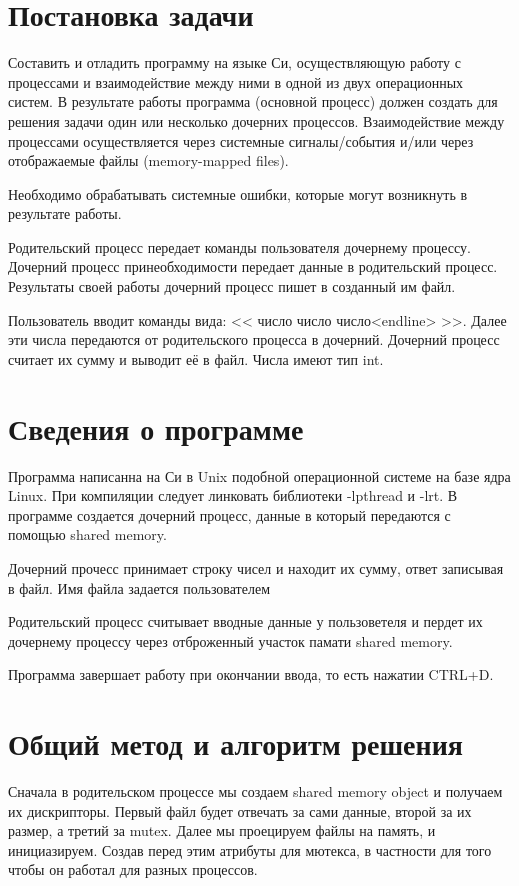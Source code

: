 \documentclass[pdf, unicode, 12pt, a4paper,oneside,fleqn]{article}
\begin{document}
\pagebreak

\section{Постановка задачи}

Составить и отладить программу на языке Си, осуществляющую работу с процессами 
и взаимодействие между ними в одной из двух операционных систем. В результате работы 
программа (основной процесс) должен создать для решения задачи один или несколько 
дочерних процессов. Взаимодействие между процессами осуществляется через системные 
сигналы/события и/или через отображаемые файлы (memory-mapped files).

Необходимо обрабатывать системные ошибки, которые могут возникнуть в результате работы.

Родительский процесс передает команды пользователя дочернему процессу. Дочерний процесс 
принеобходимости передает данные в родительский процесс. Результаты своей работы дочерний
процесс пишет в созданный им файл.

Пользователь вводит команды вида: << число число число<endline> >>. Далее эти числа 
передаются от родительского процесса в дочерний. Дочерний процесс считает их сумму и 
выводит её в файл. Числа имеют тип int.

\section{Сведения о программе}

Программа написанна на Си в Unix подобной операционной системе на базе ядра Linux.
При компиляции следует линковать библиотеки -lpthread и -lrt.
В программе создается дочерний процесс, данные в который передаются с помощью shared memory.

Дочерний прочесс принимает строку чисел и находит их сумму, ответ записывая в файл. Имя файла задается пользователем

Родительский процесс считывает вводные данные у пользоветеля и пердет их дочернему процессу через отброженный участок памати shared memory.

Программа завершает работу при окончании ввода, то есть нажатии CTRL+D.

\section{Общий метод и алгоритм решения}

Сначала в родительском процессе мы создаем shared memory object и получаем их дискрипторы. Первый файл будет 
отвечать за сами данные, второй за их размер, а третий за mutex. Далее мы проецируем
файлы на память, и инициазируем. Создав перед этим атрибуты для мютекса, в частности для того чтобы он работал для разных процессов.
\end{document}

